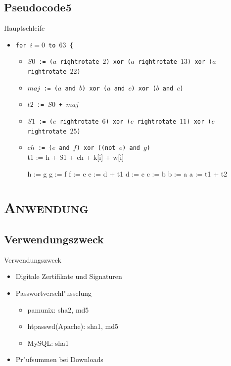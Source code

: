\documentclass[xcolor=x11names,compress]{beamer}
\renewcommand{\(}{\begin{columns}}
\renewcommand{\)}{\end{columns}}
\newcommand{\<}[1]{\begin{column}{#1}}
\renewcommand{\>}{\end{column}}
\begin{document}
\subsection{Pseudocode5}
\begin{frame}{Hauptschleife}
\begin{itemize}[]
\item[]
\texttt{for $i=0$ to $63$ \{} \\
\begin{itemize}[]
\item[]
    \texttt{$S0$ := ($a$ rightrotate $2$) xor ($a$ rightrotate $13$) xor ($a$ rightrotate $22$)} \\
\item[]
	\texttt{$maj$ := ($a$ and $b$) xor ($a$ and $c$) xor ($b$ and $c$)} \\
\item[]
	\texttt{$t2$ := $S0$ + $maj$}
\item[]
	\texttt{$S1$ := ($e$ rightrotate $6$) xor ($e$ rightrotate $11$) xor ($e$ rightrotate $25$)} \\
\item[]
	\texttt{$ch$ := ($e$ and $f$) xor ((not $e$) and $g$)} \\
        t1 := h + S1 + ch + k[i] + w[i]

        h := g
        g := f
        f := e
        e := d + t1
        d := c
        c := b
        b := a
        a := t1 + t2
\end{itemize}

\end{itemize}

\end{frame}
\section{\scshape Anwendung}
\subsection{Verwendungszweck}
\begin{frame}{Verwendungszweck}

\begin{itemize}
\item Digitale Zertifikate und Signaturen 
	\pause
\item Passwortverschl"usselung
\begin{itemize}
	\item pam\textunderscore unix: sha2, md5
	\item htpasswd(Apache): sha1, md5
	\item MySQL: sha1
\end{itemize}
\pause
\item Pr"ufsummen bei Downloads
\end{itemize}


\end{frame}
\end{document}
